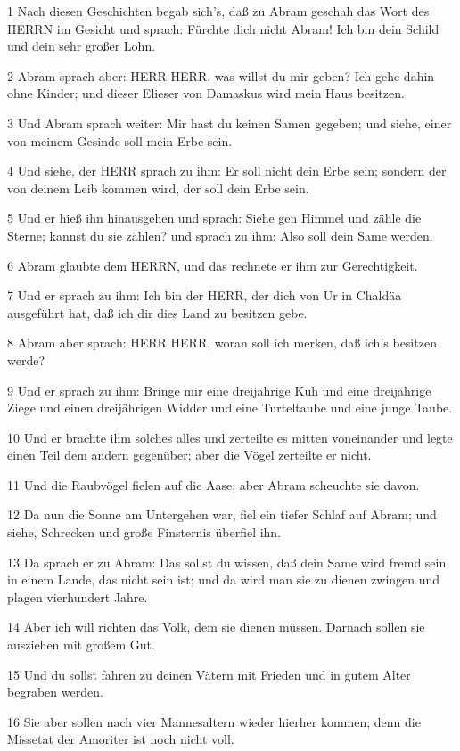\par 1 Nach diesen Geschichten begab sich's, daß zu Abram geschah das Wort des HERRN im Gesicht und sprach: Fürchte dich nicht Abram! Ich bin dein Schild und dein sehr großer Lohn.
\par 2 Abram sprach aber: HERR HERR, was willst du mir geben? Ich gehe dahin ohne Kinder; und dieser Elieser von Damaskus wird mein Haus besitzen.
\par 3 Und Abram sprach weiter: Mir hast du keinen Samen gegeben; und siehe, einer von meinem Gesinde soll mein Erbe sein.
\par 4 Und siehe, der HERR sprach zu ihm: Er soll nicht dein Erbe sein; sondern der von deinem Leib kommen wird, der soll dein Erbe sein.
\par 5 Und er hieß ihn hinausgehen und sprach: Siehe gen Himmel und zähle die Sterne; kannst du sie zählen? und sprach zu ihm: Also soll dein Same werden.
\par 6 Abram glaubte dem HERRN, und das rechnete er ihm zur Gerechtigkeit.
\par 7 Und er sprach zu ihm: Ich bin der HERR, der dich von Ur in Chaldäa ausgeführt hat, daß ich dir dies Land zu besitzen gebe.
\par 8 Abram aber sprach: HERR HERR, woran soll ich merken, daß ich's besitzen werde?
\par 9 Und er sprach zu ihm: Bringe mir eine dreijährige Kuh und eine dreijährige Ziege und einen dreijährigen Widder und eine Turteltaube und eine junge Taube.
\par 10 Und er brachte ihm solches alles und zerteilte es mitten voneinander und legte einen Teil dem andern gegenüber; aber die Vögel zerteilte er nicht.
\par 11 Und die Raubvögel fielen auf die Aase; aber Abram scheuchte sie davon.
\par 12 Da nun die Sonne am Untergehen war, fiel ein tiefer Schlaf auf Abram; und siehe, Schrecken und große Finsternis überfiel ihn.
\par 13 Da sprach er zu Abram: Das sollst du wissen, daß dein Same wird fremd sein in einem Lande, das nicht sein ist; und da wird man sie zu dienen zwingen und plagen vierhundert Jahre.
\par 14 Aber ich will richten das Volk, dem sie dienen müssen. Darnach sollen sie ausziehen mit großem Gut.
\par 15 Und du sollst fahren zu deinen Vätern mit Frieden und in gutem Alter begraben werden.
\par 16 Sie aber sollen nach vier Mannesaltern wieder hierher kommen; denn die Missetat der Amoriter ist noch nicht voll.
